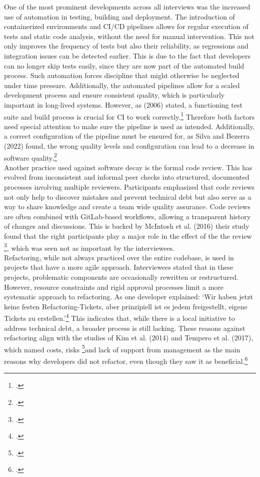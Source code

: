 One of the most prominent developments across all interviews was the increased use of automation in testing, building and deployment. The introduction of containerized environments and CI/CD pipelines allows for regular execution of tests and static code analysis, without the need for manual intervention.
This not only improves the frequency of tests but also their reliability, as regressions and integration issues can be detected earlier. This is due to the fact that developers can no longer skip tests easily, since they are now part of the automated build process.
Such automation forces discipline that might otherwise be neglected under time pressure. Additionally, the automated pipelines allow for a scaled development process and ensure consistent quality, which is particularly important in long-lived systems.
However, as  (2006) stated, a functioning test suite and build process is crucial for CI to work correctly.\footcite[]{fowlerContinuousIntegration2006} Therefore both factors need special attention to make sure the pipeline is used as intended.
Additionally, a correct configuration of the pipeline must be ensured for, as Silva and Bezerra (2022) found, the wrong quality levels and configuration can lead to a decrease in software quality.\footcite[4]{silvaEmpiricalInvestigationInfluence2022}\\

Another practice used against software decay is the formal code review. This has evolved from inconsistent and informal peer checks into structured, documented processes involving multiple reviewers. Participants emphasized that code reviews not only help to discover mistakes and prevent technical debt but also
serve as a way to share knowledge and create a team wide quality assurance. Code reviews are often combined with GitLab-based workflows, allowing a transparent history of changes and discussions. This is backed by McIntosh et al. (2016) their study found that the right participants play a major role in the effect of the the review \footcite[39]{mcintoshEmpiricalStudyImpact2016},
which was seen not as important by the interviewees.\\

Refactoring, while not always practiced over the entire codebase, is used in projects that have a more agile approach. Interviewees stated that in these projects, problematic components are occasionally rewritten or restructured. However, resource constraints and rigid approval processes limit a more systematic approach to refactoring.
As one developer explained: `Wir haben jetzt keine festen Refactoring-Tickets, aber prinzipiell ist es jedem freigestellt, eigene Tickets zu erstellen.'\footcite{Interview22025} This indicates that, while there is a local initiative to address technical debt, a broader process is still lacking.
These reasons against refactoring align with the studies of Kim et al. (2014) and Tempero et al. (2017), which named costs, risks \footcite[17]{kimEmpiricalStudyRefactoring2014}and lack of support from management as the main reasons why developers did not refactor, even though they saw it as beneficial.\footcite[60]{temperoBarriersRefactoring2017}\\

